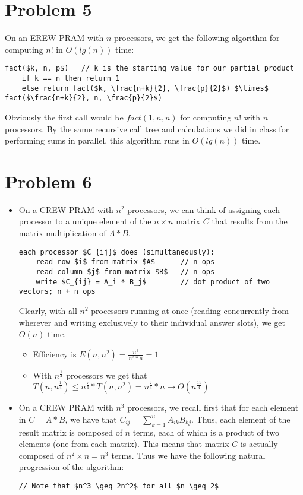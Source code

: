 \documentclass{article}
\providecommand{\prob}[1]{\section*{Problem #1}}
\begin{document}
\prob{5}
On an EREW PRAM with $n$ processors, we get the following algorithm for computing $n!$ in $O(lg(n))$ time:\\
\begin{lstlisting}
fact($k, n, p$)   // k is the starting value for our partial product
    if k == n then return 1
    else return fact($k, \frac{n+k}{2}, \frac{p}{2}$) $\times$ fact($\frac{n+k}{2}, n, \frac{p}{2}$)
\end{lstlisting}
Obviously the first call would be $fact(1, n, n)$ for computing $n!$ with $n$ processors. By the same recursive call tree and calculations we did in class for performing sums in parallel, this algorithm runs in $O(lg(n))$ time.

\prob{6}
\begin{itemize}
  \item On a CREW PRAM with $n^2$ processors, we can think of assigning each processor to a unique element of the $n \times n$ matrix $C$ that results from the matrix multiplication of $A*B$.
    \begin{lstlisting}
each processor $C_{ij}$ does (simultaneously):
    read row $i$ from matrix $A$      // n ops
    read column $j$ from matrix $B$   // n ops
    write $C_{ij} = A_i * B_j$        // dot product of two vectors; n + n ops
    \end{lstlisting}
 Clearly, with all $n^2$ processors running at once (reading concurrently from wherever and writing exclusively to their individual answer slots), we get $O(n)$ time.
    \begin{itemize}
        \item Efficiency is $E(n,n^2) = \frac{n^3}{n^2*n} = 1$
        \item With $n^{\frac{1}{4}}$ processors we get that $T(n,n^{\frac{1}{4}}) \leq n^{\frac{7}{4}}*T(n,n^2) = n^{\frac{7}{4}}*n \rightarrow O(n^{\frac{11}{4}})$
    \end{itemize}

  \item On a CREW PRAM with $n^3$ processors, we recall first that for each element in $C = A*B$, we have that $C_{ij} = \sum_{k=1}^n A_{ik}B_{kj}$. Thus, each element of the result matrix is composed of $n$ terms, each of which is a product of two elements (one from each matrix). This means that matrix $C$ is actually composed of $n^2 \times n = n^3$ terms. Thus we have the following natural progression of the algorithm:
      \begin{lstlisting}
// Note that $n^3 \geq 2n^2$ for all $n \geq 2$


\end{lstlisting}
\end{itemize}
\end{document}
